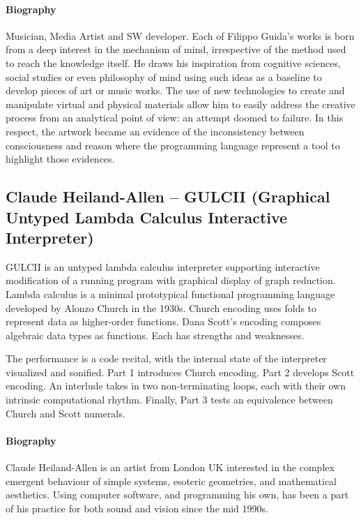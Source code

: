 \documentclass[sigplan,10pt]{acmart}\settopmatter{}
\begin{document}
\paragraph{Biography} Musician, Media Artist and SW developer. Each of Filippo Guida’s works
is born from a deep interest in the mechanism of mind, irrespective of
the method used to reach the knowledge itself.  He draws his
inspiration from cognitive sciences, social studies or even philosophy
of mind using such ideas as a baseline to develop pieces of art or
music works.  The use of new technologies to create and manipulate
virtual and physical materials allow him to easily address the
creative process from an analytical point of view: an attempt doomed
to failure.  In this respect, the artwork became an evidence of the
inconsistency between consciousness and reason where the programming
language represent a tool to highlight those evidences.


\subsection{Claude Heiland-Allen -- GULCII (Graphical Untyped Lambda Calculus Interactive Interpreter)}

GULCII is an untyped lambda calculus interpreter supporting interactive
modification of a running program with graphical display of graph reduction.
Lambda calculus is a minimal prototypical functional programming language
developed by Alonzo Church in the 1930s.  Church encoding uses folds to
represent data as higher-order functions.  Dana Scott's encoding composes
algebraic data types as functions.  Each has strengths and weaknesses.

The performance is a code recital, with the internal state of the interpreter
visualized and sonified.  Part 1 introduces Church encoding.  Part 2 develops
Scott encoding.  An interlude takes in two non-terminating loops, each with
their own intrinsic computational rhythm.  Finally, Part 3 tests an equivalence
between Church and Scott numerals.

\paragraph{Biography}

Claude Heiland-Allen is an artist from London UK interested in the complex
emergent behaviour of simple systems, esoteric geometries, and mathematical
aesthetics.  Using computer software, and programming his own, has been a
part of his practice for both sound and vision since the mid 1990s.
\end{document}
